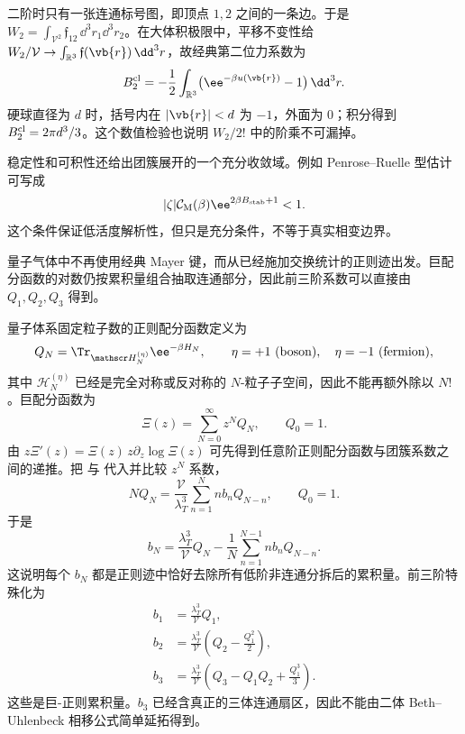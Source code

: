 二阶时只有一张连通标号图，即顶点 \(1,2\) 之间的一条边。于是 \(W_2=\int_{\mathcal V^2}\mathfrak f_{12}\,\dd^3r_1\dd^3r_2\)。在大体积极限中，平移不变性给 \(W_2/\mathcal V\to\int_{\mathbb R^3}\mathfrak f(\vb{r})\,\dd^3r\)，故经典第二位力系数为
\[
B_2^{\rm cl}=-\frac12\int_{\mathbb R^3}
\bigl(\ee^{-\beta u(\vb{r})}-1\bigr)\,\dd^3r .
\]
硬球直径为 \(d\) 时，括号内在 \(|\vb{r}|<d\) 为 \(-1\)，外面为 \(0\)；积分得到 \(B_2^{\rm cl}=2\pi d^3/3\)。这个数值检验也说明 \(W_2/2!\) 中的阶乘不可漏掉。

稳定性和可积性还给出团簇展开的一个充分收敛域。例如 Penrose--Ruelle 型估计可写成
\begin{equation}
 |\zeta|\mathcal C_{\rm M}(\beta)\ee^{2\beta B_{\rm stab}+1}<1.
 \label{eq:phys-sm-mayer-sufficient-condition}
\end{equation}
这个条件保证低活度解析性，但只是充分条件，不等于真实相变边界。

量子气体中不再使用经典 Mayer 键，而从已经施加交换统计的正则迹出发。巨配分函数的对数仍按累积量组合抽取连通部分，因此前三阶系数可以直接由 \(Q_1,Q_2,Q_3\) 得到。

量子体系固定粒子数的正则配分函数定义为
\begin{equation}
 Q_N=\Tr_{\mathscr H_N^{(\eta)}}\ee^{-\beta H_N},
 \qquad
 \eta=+1\ \text{(boson)},\quad
 \eta=-1\ \text{(fermion)},
 \label{eq:phys-sm-canonical-qn}
\end{equation}
其中 \(\mathscr H_N^{(\eta)}\) 已经是完全对称或反对称的 \(N\)-粒子子空间，因此不能再额外除以 \(N!\)。巨配分函数为
\begin{equation}
 \Xi(z)=\sum_{N=0}^{\infty}z^NQ_N,
 \qquad Q_0=1.
 \label{eq:phys-sm-quantum-grand}
\end{equation}
由 \(z\Xi'(z)=\Xi(z)\,z\partial_z\log\Xi(z)\) 可先得到任意阶正则配分函数与团簇系数之间的递推。把 与 代入并比较 \(z^N\) 系数，
\begin{equation}
 NQ_N=\frac{\mathcal V}{\lambda_T^3}
 \sum_{n=1}^{N}n b_n Q_{N-n},
 \qquad Q_0=1.
 \label{eq:phys-sm-general-cluster-recurrence}
\end{equation}
于是
\begin{equation}
 b_N=\frac{\lambda_T^3}{\mathcal V}Q_N
 -\frac1N\sum_{n=1}^{N-1}n b_n Q_{N-n}.
 \label{eq:phys-sm-cluster-recurrence-solved}
\end{equation}
这说明每个 \(b_N\) 都是正则迹中恰好去除所有低阶非连通分拆后的累积量。前三阶特殊化为
\begin{align}
 b_1&=\frac{\lambda_T^3}{\mathcal V}Q_1,
 \label{eq:phys-sm-b1-canonical}\\
 b_2&=\frac{\lambda_T^3}{\mathcal V}
 \left(Q_2-\frac{Q_1^2}{2}\right),
 \label{eq:phys-sm-b2-canonical}\\
 b_3&=\frac{\lambda_T^3}{\mathcal V}
 \left(Q_3-Q_1Q_2+\frac{Q_1^3}{3}\right).
 \label{eq:phys-sm-b3-canonical}
\end{align}
这些是巨-正则累积量。\(b_3\) 已经含真正的三体连通扇区，因此不能由二体 Beth--Uhlenbeck 相移公式简单延拓得到。

